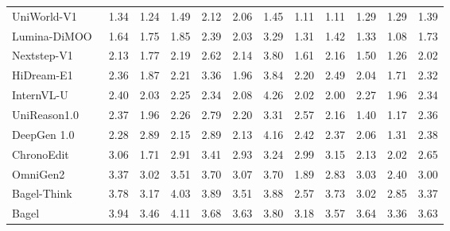 \documentclass{llmxive}
\begin{document}
\begin{table}[t]
{\begin{tabular}{l|cccccccccc|c}
            UniWorld-V1~\cite{lin2025uniworld}
            & 1.34 & 1.24 & 1.49 & 2.12 & 2.06 & 1.45 & 1.11 & 1.11 & 1.29 & 1.29
            & \cellcolor[HTML]{C8C8C8}1.39 \\

            Lumina-DiMOO~\cite{xin2025lumina}
            & 1.64 & 1.75 & 1.85 & 2.39 & 2.03 & 3.29 & 1.31 & 1.42 & 1.33 & 1.08
            & \cellcolor[HTML]{C8C8C8}1.73 \\

            Nextstep-V1~\cite{han2025nextstep}
            & 2.13 & 1.77 & 2.19 & 2.62 & 2.14 & 3.80 & 1.61 & 2.16 & 1.50 & 1.26
            & \cellcolor[HTML]{C8C8C8}2.02 \\

            HiDream-E1~\cite{cai2025hidream}
            & 2.36 & 1.87 & 2.21 & 3.36 & 1.96 & 3.84 & 2.20 & 2.49 & 2.04 & 1.71
            & \cellcolor[HTML]{C8C8C8}2.32 \\

            InternVL-U~\cite{tian2026internvl}
            & 2.40 & 2.03 & 2.25 & 2.34 & 2.08 & 4.26 & 2.02 & 2.00 & 2.27 & 1.96
            & \cellcolor[HTML]{C8C8C8}2.34 \\

            UniReason1.0~\cite{wang2026unireason}
            & 2.37 & 1.96 & 2.26 & 2.79 & 2.20 & 3.31 & 2.57 & 2.16 & 1.40 & 1.17
            & \cellcolor[HTML]{C8C8C8}2.36 \\

            DeepGen 1.0~\cite{wang2026deepgen}
            & 2.28 & 2.89 & 2.15 & 2.89 & 2.13 & 4.16 & 2.42 & 2.37 & 2.06 & 1.31
            & \cellcolor[HTML]{C8C8C8}2.38 \\

            ChronoEdit~\cite{wu2025chronoedit}
            & 3.06 & 1.71 & 2.91 & 3.41 & 2.93 & 3.24 & 2.99 & 3.15 & 2.13 & 2.02
            & \cellcolor[HTML]{C8C8C8}2.65 \\

            OmniGen2~\cite{wu2025omnigen2}
            & 3.37 & 3.02 & 3.51 & 3.70 & 3.07 & 3.70 & 1.89 & 2.83 & 3.03 & 2.40
            & \cellcolor[HTML]{C8C8C8}3.00 \\

            Bagel-Think~\cite{deng2025emerging}
            & 3.78 & 3.17 & 4.03 & 3.89 & 3.51 & 3.88 & 2.57 & 3.73 & 3.02 & 2.85
            & \cellcolor[HTML]{C8C8C8}3.37 \\
            
            Bagel~\cite{deng2025emerging}
            & 3.94 & 3.46 & 4.11 & 3.68 & 3.63 & 3.80 & 3.18 & 3.57 & 3.64 & 3.36
            & \cellcolor[HTML]{C8C8C8}3.63 \\


\end{tabular}}
\end{table}
\end{document}
